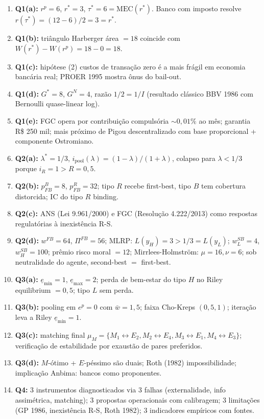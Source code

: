\documentclass[11pt,addpoints]{exam}
\newcommand{\MEC}{\text{MEC}}
\begin{document}
\medskip
\begin{enumerate}[label=$\square$,leftmargin=*]
\item \textbf{Q1(a):} $r^p = 6$, $r^* = 3$, $\tau^* = 6 = \MEC(r^*)$. Banco com imposto resolve $r(\tau^*) = (12-6)/2 = 3 = r^*$.
\item \textbf{Q1(b):} triângulo Harberger área $= 18$ coincide com $W(r^*) - W(r^p) = 18 - 0 = 18$.
\item \textbf{Q1(c):} hipótese (2) custos de transação zero é a mais frágil em economia bancária real; PROER 1995 mostra ônus do bail-out.
\item \textbf{Q1(d):} $G^* = 8$, $G^N = 4$, razão $1/2 = 1/I$ (resultado clássico BBV 1986 com Bernoulli quase-linear log).
\item \textbf{Q1(e):} FGC opera por contribuição compulsória $\sim 0{,}01\%$ ao mês; garantia R\$ 250 mil; mais próximo de Pigou descentralizado com base proporcional + componente Ostromiano.
\item \textbf{Q2(a):} $\lambda^* = 1/3$, $i_{\text{pool}}(\lambda) = (1-\lambda)/(1+\lambda)$, colapso para $\lambda < 1/3$ porque $i_R = 1 > R = 0{,}5$.
\item \textbf{Q2(b):} $p^B_{FB} = 8$, $p^R_{FB} = 32$; tipo $R$ recebe first-best, tipo $B$ tem cobertura distorcida; IC do tipo $R$ binding.
\item \textbf{Q2(c):} ANS (Lei 9.961/2000) e FGC (Resolução 4.222/2013) como respostas regulatórias à inexistência R-S.
\item \textbf{Q2(d):} $w^{FB} = 64$, $\Pi^{FB} = 56$; MLRP: $L(y_H)=3>1/3=L(y_L)$; $w^{SB}_L = 4$, $w^{SB}_H = 100$; prêmio risco moral $= 12$; Mirrlees-Holmström: $\mu = 16, \nu = 6$; sob neutralidade do agente, second-best $=$ first-best.
\item \textbf{Q3(a):} $\underline{e}_{\min} = 1$, $\underline{e}_{\max} = 2$; perda de bem-estar do tipo $H$ no Riley equilibrium $= 0{,}5$; tipo $L$ sem perda.
\item \textbf{Q3(b):} pooling em $e^p = 0$ com $\bar w = 1{,}5$; faixa Cho-Kreps $(0{,}5, 1)$; iteração leva a Riley $\underline{e}_{\min} = 1$.
\item \textbf{Q3(c):} matching final $\mu_M = \{M_1\leftrightarrow E_2, M_2\leftrightarrow E_4, M_3\leftrightarrow E_1, M_4\leftrightarrow E_3\}$; verificação de estabilidade por exaustão de pares preferidos.
\item \textbf{Q3(d):} $M$-ótimo + $E$-péssimo são duais; Roth (1982) impossibilidade; implicação Anbima: bancos como proponentes.
\item \textbf{Q4:} 3 instrumentos diagnosticados via 3 falhas (externalidade, info assimétrica, matching); 3 propostas operacionais com calibragem; 3 limitações (GP 1986, inexistência R-S, Roth 1982); 3 indicadores empíricos com fontes.
\end{enumerate}
\end{document}

